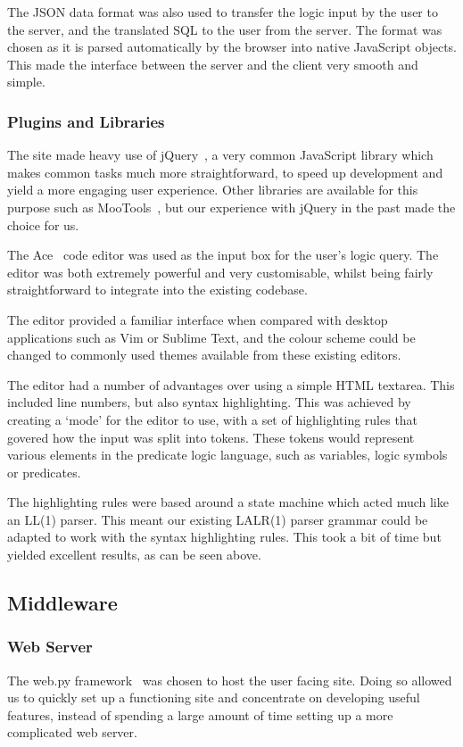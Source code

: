 \documentclass[a4paper, 11pt]{article}
\begin{document}
      The JSON data format was also used to transfer the logic input by the user
      to the server, and the translated SQL to the user from the server. The
      format was chosen as it is parsed automatically by the browser into
      native JavaScript objects. This made the interface between the server and
      the client very smooth and simple.

    \subsubsection{Plugins and Libraries}
      The site made heavy use of jQuery~\cite{jquery}, a very common JavaScript
      library which makes common tasks much more straightforward, to speed up
      development and yield a more engaging user experience. Other libraries are
      available for this purpose such as MooTools~\cite{mootools}, but our
      experience with jQuery in the past made the choice for us.

      The Ace~\cite{aceEditor} code editor was used as the input box for the
      user's logic query. The editor was both extremely powerful and very
      customisable, whilst being fairly straightforward to integrate into the
      existing codebase.

      The editor provided a familiar interface when compared with desktop
      applications such as Vim or Sublime Text, and the colour scheme could be
      changed to commonly used themes available from these existing editors.

      The editor had a number of advantages over using a simple HTML textarea.
      This included line numbers, but also syntax highlighting. This was
      achieved by creating a `mode' for the editor to use, with a set of
      highlighting rules that govered how the input was split into tokens. These
      tokens would represent various elements in the predicate logic language,
      such as variables, logic symbols or predicates.

      The highlighting rules were based around a state machine which acted much
      like an LL(1) parser. This meant our existing LALR(1) parser grammar could
      be adapted to work with the syntax highlighting rules. This took a bit of
      time but yielded excellent results, as can be seen above.

  \subsection{Middleware}
    \subsubsection{Web Server}
      The web.py framework~\cite{webpy} was chosen to host the user facing site.
      Doing so allowed us to quickly set up a functioning site and concentrate
      on developing useful features, instead of spending a large amount of time
      setting up a more complicated web server.
\end{document}
